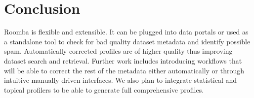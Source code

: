 \documentclass{sig-alternate}
\begin{document}
\section{Conclusion}
Roomba is flexible and extensible. It can be plugged into data portals or used as a standalone tool to check for bad quality dataset metadata and identify possible spam. Automatically corrected profiles are of higher quality thus improving dataset search and retrieval. Further work includes introducing workflows that will be able to correct the rest of the metadata either automatically or through intuitive manually-driven interfaces. We also plan to integrate statistical and topical profilers to be able to generate full comprehensive profiles.



\end{document}
